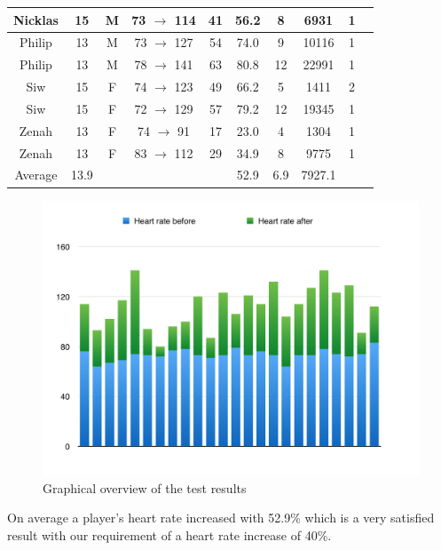 \documentclass[11pt]{report}
\begin{document}
\begin{table}[H]
\begin{tabular}{ | c | c | c | c | c | c | c | c | c | c |}
Nicklas & 15 & M & 73 $\rightarrow$ 114 & 41 & 56.2 & 8 & 6931 & 1\\ \hline 
Philip & 13 & M & 73 $\rightarrow$ 127 & 54 & 74.0 & 9 & 10116 & 1\\ \hline 
Philip & 13 & M & 78 $\rightarrow$ 141 & 63 & 80.8 &12 & 22991& 1\\ \hline 
Siw & 15 & F & 74 $\rightarrow$ 123 & 49 & 66.2 & 5 & 1411 & 2\\ \hline 
Siw & 15 & F & 72 $\rightarrow$ 129 & 57 & 79.2 & 12 & 19345 & 1\\ \hline 
Zenah & 13 & F & 74 $\rightarrow$ 91 & 17 & 23.0 & 4 & 1304 & 1\\ \hline 
Zenah & 13 & F & 83 $\rightarrow$ 112 & 29 & 34.9 & 8 & 9775 & 1\\ \hline
Average & 13.9 & \multicolumn{2}{r}{} & & 52.9 & 6.9 & 7927.1 & \\ \hline
\end{tabular}
\end{table}

\begin{figure}[H]
	\centering
	\includegraphics[scale=0.6]{../GFX/Resultsgraph.png}
	\caption{Graphical overview of the test results}
\end{figure}

On average a player's heart rate increased with 52.9\% which is a very satisfied result with our requirement of a heart rate increase of 40\%.
\end{document}
